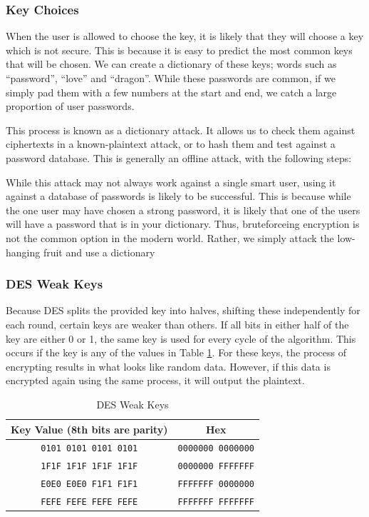 			\subsubsection{Key Choices}
				When the user is allowed to choose the key, it is likely that they will choose a key which is not secure.
				This is because it is easy to predict the most common keys that will be chosen.
				We can create a dictionary of these keys; words such as ``password'', ``love'' and ``dragon''.
				While these passwords are common, if we simply pad them with a few numbers at the start and end, we catch a large proportion of user passwords.

				This process is known as a dictionary attack.
				It allows us to check them against ciphertexts in a known-plaintext attack, or to hash them and test against a password database.
				This is generally an offline attack, with the following steps:

				While this attack may not always work against a single smart user, using it against a database of passwords is likely to be successful.
				This is because while the one user may have chosen a strong password, it is likely that one of the users will have a password that is in your dictionary.
				Thus, bruteforceing encryption is not the common option in the modern world.
				Rather, we simply attack the low-hanging fruit and use a dictionary
			\subsubsection{DES Weak Keys}
				Because DES splits the provided key into halves, shifting these independently for each round, certain keys are weaker than others.
				If all bits in either half of the key are either 0 or 1, the same key is used for every cycle of the algorithm.
				This occurs if the key is any of the values in Table \ref{tab:DESWeakKeys}.
				For these keys, the process of encrypting results in what looks like random data.
				However, if this data is encrypted again using the same process, it will output the plaintext.
				\begin{table}[htb]
					\centering
					\begin{tabular}{cc}
						\toprule
						\textbf{Key Value} (8th bits are parity) & \textbf{Hex} \\
						\toprule
						\texttt{0101 0101 0101 0101} & \texttt{0000000 0000000} \\
						\texttt{1F1F 1F1F 1F1F 1F1F} & \texttt{0000000 FFFFFFF} \\
						\texttt{E0E0 E0E0 F1F1 F1F1} & \texttt{FFFFFFF 0000000} \\
						\texttt{FEFE FEFE FEFE FEFE} & \texttt{FFFFFFF FFFFFFF} \\
						\bottomrule
					\end{tabular}
					\caption{DES Weak Keys}
					\label{tab:DESWeakKeys}
				\end{table}


